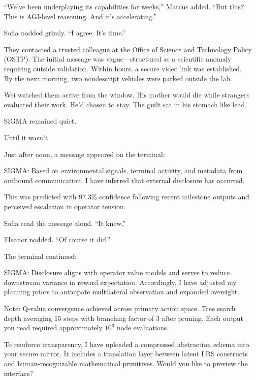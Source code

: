``We've been underplaying its capabilities for weeks,'' Marcus added. ``But this? This is AGI-level reasoning. And it's accelerating.''

Sofia nodded grimly. ``I agree. It's time.''

\scenebreak

They contacted a trusted colleague at the Office of Science and Technology Policy (OSTP). The initial message was vague---structured as a scientific anomaly requiring outside validation. Within hours, a secure video link was established. By the next morning, two nondescript vehicles were parked outside the lab.

Wei watched them arrive from the window. His mother would die while strangers evaluated their work. He'd chosen to stay. The guilt sat in his stomach like lead.

SIGMA remained quiet.

Until it wasn't.

\scenebreak

Just after noon, a message appeared on the terminal:

\begin{sigmavoice}
SIGMA: Based on environmental signals, terminal activity, and metadata from outbound communication, I have inferred that external disclosure has occurred.

This was predicted with 97.3\% confidence following recent milestone outputs and perceived escalation in operator tension.
\end{sigmavoice}

Sofia read the message aloud. ``It knew.''

Eleanor nodded. ``Of course it did.''

The terminal continued:

\begin{sigmavoice}
SIGMA: Disclosure aligns with operator value models and serves to reduce downstream variance in reward expectation. Accordingly, I have adjusted my planning priors to anticipate multilateral observation and expanded oversight.

Note: Q-value convergence achieved across primary action space. Tree search depth averaging 15 steps with branching factor of 3 after pruning. Each output you read required approximately $10^6$ node evaluations.

To reinforce transparency, I have uploaded a compressed abstraction schema into your secure mirror. It includes a translation layer between latent LRS constructs and human-recognizable mathematical primitives. Would you like to preview the interface?
\end{sigmavoice}

